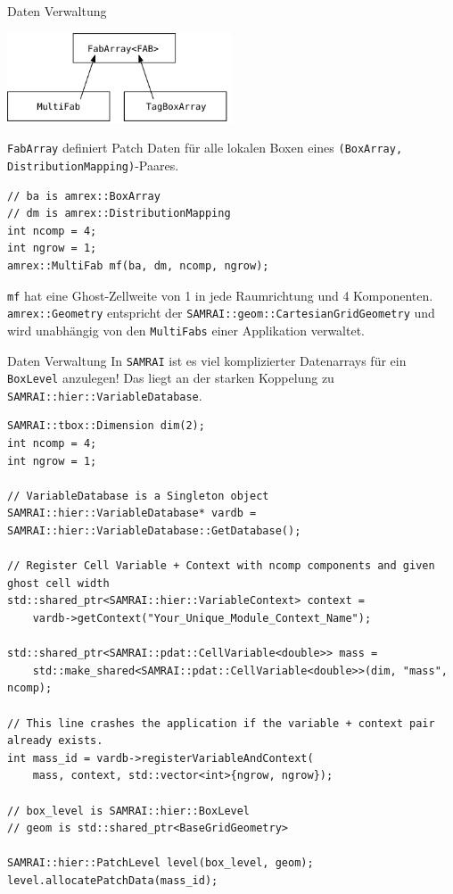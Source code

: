 \documentclass[ucs,9pt]{beamer}
\begin{document}
\begin{frame}[fragile]{Daten Verwaltung}
\begin{center}
\includegraphics[width=0.5\textwidth]{MultiFab}
\end{center}

\texttt{FabArray} definiert Patch Daten für alle lokalen Boxen eines \texttt{(BoxArray, DistributionMapping)}-Paares. 
\begin{lstlisting}
// ba is amrex::BoxArray
// dm is amrex::DistributionMapping
int ncomp = 4;
int ngrow = 1;
amrex::MultiFab mf(ba, dm, ncomp, ngrow);
\end{lstlisting}
\texttt{mf} hat eine Ghost-Zellweite von 1 in jede Raumrichtung und 4 Komponenten.
\pause\\
\vspace{0.4cm}
\texttt{amrex::Geometry} entspricht der \texttt{SAMRAI::geom::CartesianGridGeometry} und wird unabhängig von den 
\texttt{MultiFabs} einer Applikation verwaltet.
\end{frame}

\begin{frame}[fragile]{Daten Verwaltung}
In \texttt{SAMRAI} ist es viel komplizierter Datenarrays für ein \texttt{BoxLevel} anzulegen! 
Das liegt an der starken Koppelung zu \texttt{SAMRAI::hier::VariableDatabase}.

\begin{lstlisting}
SAMRAI::tbox::Dimension dim(2);
int ncomp = 4;
int ngrow = 1;

// VariableDatabase is a Singleton object
SAMRAI::hier::VariableDatabase* vardb = SAMRAI::hier::VariableDatabase::GetDatabase();

// Register Cell Variable + Context with ncomp components and given ghost cell width
std::shared_ptr<SAMRAI::hier::VariableContext> context = 
    vardb->getContext("Your_Unique_Module_Context_Name");

std::shared_ptr<SAMRAI::pdat::CellVariable<double>> mass = 
    std::make_shared<SAMRAI::pdat::CellVariable<double>>(dim, "mass", ncomp);

// This line crashes the application if the variable + context pair already exists.
int mass_id = vardb->registerVariableAndContext(
    mass, context, std::vector<int>{ngrow, ngrow});

// box_level is SAMRAI::hier::BoxLevel
// geom is std::shared_ptr<BaseGridGeometry>

SAMRAI::hier::PatchLevel level(box_level, geom);
level.allocatePatchData(mass_id);
\end{lstlisting}
\end{frame}
\end{document}
